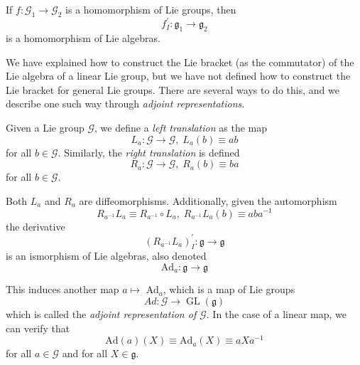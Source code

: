 \documentclass{article}
\DeclareMathOperator{\GL}{GL}
\begin{document}
    \begin{proposition}
      If $f: \mathcal{G}_1 \longrightarrow \mathcal{G}_2$ is a homomorphism of Lie groups, then 
      \begin{equation}
        f_I^\prime: \mathfrak{g}_1 \longrightarrow \mathfrak{g}_2
      \end{equation}
      is a homomorphism of Lie algebras. 
    \end{proposition}

    We have explained how to construct the Lie bracket (as the commutator) of the Lie algebra of a linear Lie group, but we have not defined how to construct the Lie bracket for general Lie groups. There are several ways to do this, and we describe one such way through \textit{adjoint representations}. 

    \begin{definition}
      Given a Lie group $\mathcal{G}$, we define a \textit{left translation} as the map
      \begin{equation}
        L_a: \mathcal{G} \longrightarrow \mathcal{G}, \; L_a (b) \equiv a b
      \end{equation}
      for all $b \in \mathcal{G}$. Similarly, the \textit{right translation} is defined
      \begin{equation}
        R_a: \mathcal{G} \longrightarrow \mathcal{G}, \; R_a (b) \equiv b a
      \end{equation}
      for all $b \in \mathcal{G}$. 
    \end{definition}

    Both $L_a$ and $R_a$ are diffeomorphisms. Additionally, given the automorphism
    \begin{equation}
      R_{a^{-1}} L_a \equiv R_{a^{-1}} \circ L_a, \; R_{a^{-1}} L_a (b) \equiv a b a^{-1}
    \end{equation}
    the derivative
    \begin{equation}
      (R_{a^{-1}} L_a)^\prime_I: \mathfrak{g} \longrightarrow \mathfrak{g}
    \end{equation}
    is an ismorphism of Lie algebras, also denoted 
    \begin{equation}
      \text{Ad}_a: \mathfrak{g} \longrightarrow \mathfrak{g}
    \end{equation}

    \begin{definition}
      This induces another map $a \mapsto$ Ad$_a$, which is a map of Lie groups
      \begin{equation}
        Ad: \mathcal{G} \longrightarrow \GL(\mathcal{\mathfrak{g}})
      \end{equation}
      which is called the \textit{adjoint representation of $\mathcal{G}$}. In the case of a linear map, we can verify that 
      \begin{equation}
        \text{Ad}(a) (X) \equiv \text{Ad}_a (X) \equiv a X a^{-1}
      \end{equation}
      for all $a \in \mathcal{G}$ and for all $X \in \mathfrak{g}$. 
    \end{definition}
\end{document}
